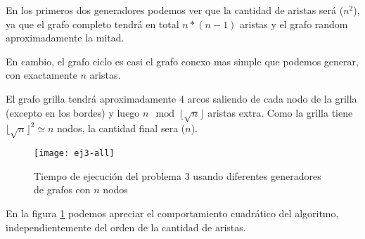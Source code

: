 En los primeros dos generadores podemos ver que la cantidad de aristas será \bigo($n^2$), ya que el grafo completo tendrá en total $n * (n-1)$ aristas y el grafo random aproximadamente la mitad.

En cambio, el grafo ciclo es casi el grafo conexo mas simple que podemos generar, con exactamente $n$ aristas.

El grafo grilla tendrá aproximadamente $4$ arcos saliendo de cada nodo de la grilla (excepto en los bordes) y luego $n \mod \lfloor \sqrt{n} \rfloor$ aristas extra. Como la grilla tiene $\lfloor \sqrt{n} \rfloor^2 \simeq n$ nodos, la cantidad final sera \bigo($n$).

    \begin{figure}[H]
    	\centering
    	\texttt{[image: ej3-all]}
    	\caption{Tiempo de ejecución del problema 3 usando diferentes generadores de grafos con $n$ nodos}
    	\label{fig:ej3-all}
    \end{figure}

En la figura \ref{fig:ej3-all} podemos apreciar el comportamiento cuadrático del algoritmo, independientemente del orden de la cantidad de aristas.

